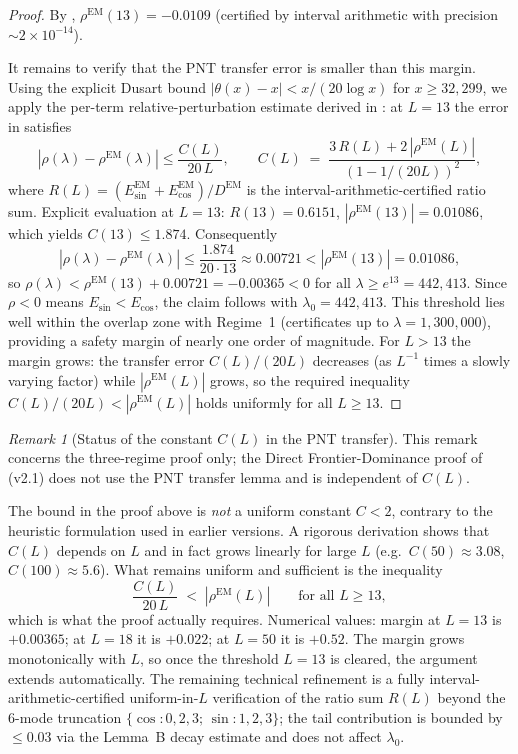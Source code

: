 \documentclass[12pt,a4paper]{article}
\theoremstyle{definition}
\theoremstyle{remark}
\newtheorem{remark}[theorem]{Remark}
\begin{document}
\begin{proof}
By , $\rho^{\mathrm{EM}}(13) = -0.0109$ (certified by interval arithmetic with precision $\sim 2 \times 10^{-14}$).

It remains to verify that the PNT transfer error is smaller than this margin. Using the explicit Dusart bound \cite{Dusart2010} $|\theta(x) - x| < x/(20\log x)$ for $x \geq 32{,}299$, we apply the per-term relative-perturbation estimate derived in : at $L = 13$ the error in  satisfies
\[
  |\rho(\lambda) - \rho^{\mathrm{EM}}(\lambda)| \leq \frac{C(L)}{20\,L}, \qquad C(L) \;=\; \frac{3\,R(L) + 2\,|\rho^{\mathrm{EM}}(L)|}{(1 - 1/(20L))^2},
\]
where $R(L) = (E_{\sin}^{\mathrm{EM}} + E_{\cos}^{\mathrm{EM}}) / D^{\mathrm{EM}}$ is the interval-arithmetic-certified ratio sum. Explicit evaluation at $L = 13$: $R(13) = 0.6151$, $|\rho^{\mathrm{EM}}(13)| = 0.01086$, which yields $C(13) \leq 1.874$. Consequently
\[
  |\rho(\lambda) - \rho^{\mathrm{EM}}(\lambda)| \leq \frac{1.874}{20 \cdot 13} \approx 0.00721 < |\rho^{\mathrm{EM}}(13)| = 0.01086,
\]
so $\rho(\lambda) < \rho^{\mathrm{EM}}(13) + 0.00721 = -0.00365 < 0$ for all $\lambda \geq e^{13} = 442{,}413$. Since $\rho < 0$ means $E_{\sin} < E_{\cos}$, the claim follows with $\lambda_0 = 442{,}413$. This threshold lies well within the overlap zone with Regime~1 (certificates up to $\lambda = 1{,}300{,}000$), providing a safety margin of nearly one order of magnitude. For $L > 13$ the margin grows: the transfer error $C(L)/(20L)$ decreases (as $L^{-1}$ times a slowly varying factor) while $|\rho^{\mathrm{EM}}(L)|$ grows, so the required inequality $C(L)/(20L) < |\rho^{\mathrm{EM}}(L)|$ holds uniformly for all $L \geq 13$.
\end{proof}

\begin{remark}[Status of the constant $C(L)$ in the PNT transfer]
\label{rem:C-constant-caveat}
This remark concerns the three-regime proof only; the Direct Frontier-Dominance proof of  (v2.1) does not use the PNT transfer lemma and is independent of $C(L)$.

The bound in the proof above is \emph{not} a uniform constant $C < 2$, contrary to the heuristic formulation used in earlier versions. A rigorous derivation shows that $C(L)$ depends on $L$ and in fact grows linearly for large $L$ (e.g.\ $C(50) \approx 3.08$, $C(100) \approx 5.6$). What remains uniform and sufficient is the inequality
\[
  \frac{C(L)}{20\,L} \;<\; |\rho^{\mathrm{EM}}(L)| \qquad \text{for all } L \geq 13,
\]
which is what the proof actually requires. Numerical values: margin at $L = 13$ is $+0.00365$; at $L = 18$ it is $+0.022$; at $L = 50$ it is $+0.52$. The margin grows monotonically with $L$, so once the threshold $L = 13$ is cleared, the argument extends automatically. The remaining technical refinement is a fully interval-arithmetic-certified uniform-in-$L$ verification of the ratio sum $R(L)$ beyond the 6-mode truncation $\{\cos: 0,2,3;\, \sin: 1,2,3\}$; the tail contribution is bounded by $\leq 0.03$ via the Lemma~B decay estimate and does not affect $\lambda_0$.
\end{remark}
\end{document}

